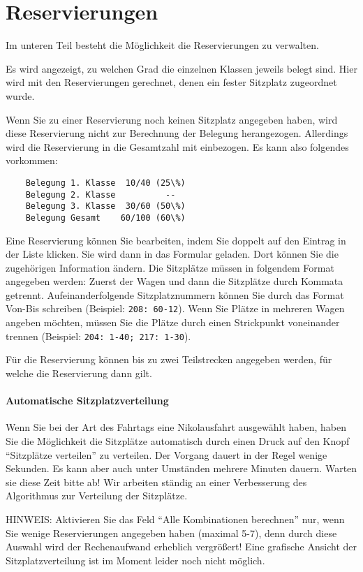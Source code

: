 \section{Reservierungen}
Im unteren Teil besteht die Möglichkeit die Reservierungen zu verwalten.

Es wird angezeigt, zu welchen Grad die einzelnen Klassen jeweils belegt sind. Hier wird mit den Reservierungen gerechnet, denen ein fester Sitzplatz zugeordnet wurde.

Wenn Sie zu einer Reservierung noch keinen Sitzplatz angegeben haben, wird diese Reservierung nicht zur Berechnung der Belegung herangezogen.
Allerdings wird die Reservierung in die Gesamtzahl mit einbezogen.
Es kann also folgendes vorkommen:
\begin{verbatim}
	Belegung 1. Klasse  10/40 (25\%)
	Belegung 2. Klasse          --
	Belegung 3. Klasse  30/60 (50\%)
	Belegung Gesamt    60/100 (60\%)
\end{verbatim}

Eine Reservierung können Sie bearbeiten, indem Sie doppelt auf den Eintrag in der Liste klicken.
Sie wird dann in das Formular geladen. Dort können Sie die zugehörigen Information ändern.
Die Sitzplätze müssen in folgendem Format angegeben werden: Zuerst der Wagen und dann die Sitzplätze durch Kommata getrennt.
Aufeinanderfolgende Sitzplatznummern können Sie durch das Format Von-Bis schreiben (Beispiel: \texttt{208: 60-12}).
Wenn Sie Plätze in mehreren Wagen angeben möchten, müssen Sie die Plätze durch einen Strickpunkt voneinander trennen
(Beispiel: \texttt{204: 1-40; 217: 1-30}).

Für die Reservierung können bis zu zwei Teilstrecken angegeben werden, für welche die Reservierung dann gilt.

\paragraph{Automatische Sitzplatzverteilung}
Wenn Sie bei der Art des Fahrtags eine Nikolausfahrt ausgewählt haben, haben Sie die Möglichkeit die Sitzplätze automatisch durch einen Druck auf den Knopf ``Sitzplätze verteilen'' zu verteilen.
Der Vorgang dauert in der Regel wenige Sekunden.
Es kann aber auch unter Umständen mehrere Minuten dauern.
Warten sie diese Zeit bitte ab!
Wir arbeiten ständig an einer Verbesserung des Algorithmus zur Verteilung der Sitzplätze.

HINWEIS: Aktivieren Sie das Feld ``Alle Kombinationen berechnen'' nur, wenn Sie wenige Reservierungen angegeben haben (maximal 5-7),
denn durch diese Auswahl wird der Rechenaufwand erheblich vergrößert!
Eine grafische Ansicht der Sitzplatzverteilung ist im Moment leider noch nicht möglich.

